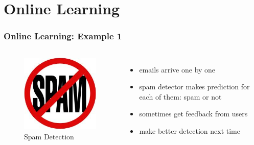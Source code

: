 \documentclass{beamer}
\begin{document}
\section{Online Learning}
\frame{\tableofcontents[currentsection]}
\begin{frame}
\frametitle{Online Learning: Example 1}

\begin{columns}
\begin{figure}
\includegraphics[scale = 0.4]{spam}
\caption{Spam Detection}
\end{figure}
\begin{itemize}
\item emails arrive one by one
\pause
\item spam detector makes prediction for each of them: {\color{blue}spam or not}
\pause
\item sometimes get {\color{blue}feedback} from users
\pause
\item make better detection next time  
\end{itemize}

\end{columns}

\end{frame}
\end{document}

